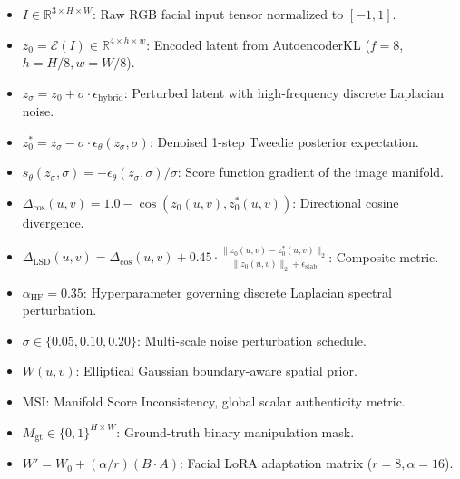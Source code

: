 \documentclass[12pt,a4paper]{report}
\begin{document}
\begin{tcolorbox}[academicbox, title=Architectural Framework \& Forensic Notation Guide]
\small
\begin{itemize}\setlength\itemsep{0.2em}
    \item $I \in \mathbb{R}^{3 \times H \times W}$: Raw RGB facial input tensor normalized to $[-1, 1]$.
    \item $z_0 = \mathcal{E}(I) \in \mathbb{R}^{4 \times h \times w}$: Encoded latent from AutoencoderKL ($f=8$, $h=H/8, w=W/8$).
    \item $z_\sigma = z_0 + \sigma \cdot \epsilon_{\text{hybrid}}$: Perturbed latent with high-frequency discrete Laplacian noise.
    \item $z^*_0 = z_\sigma - \sigma \cdot \epsilon_\theta(z_\sigma, \sigma)$: Denoised 1-step Tweedie posterior expectation.
    \item $s_\theta(z_\sigma, \sigma) = -\epsilon_\theta(z_\sigma, \sigma)/\sigma$: Score function gradient of the image manifold.
    \item $\Delta_{\cos}(u, v) = 1.0 - \cos(z_0(u, v), z^*_0(u, v))$: Directional cosine divergence.
    \item $\Delta_{\text{LSD}}(u, v) = \Delta_{\cos}(u, v) + 0.45 \cdot \frac{\|z_0(u, v) - z^*_0(u, v)\|_2}{\|z_0(u, v)\|_2 + \epsilon_{\text{stab}}}$: Composite metric.
    \item $\alpha_{\text{HF}} = 0.35$: Hyperparameter governing discrete Laplacian spectral perturbation.
    \item $\sigma \in \{0.05, 0.10, 0.20\}$: Multi-scale noise perturbation schedule.
    \item $W(u, v)$: Elliptical Gaussian boundary-aware spatial prior.
    \item $\text{MSI}$: Manifold Score Inconsistency, global scalar authenticity metric.
    \item $M_{\text{gt}} \in \{0, 1\}^{H \times W}$: Ground-truth binary manipulation mask.
    \item $W' = W_0 + (\alpha/r)(B \cdot A)$: Facial LoRA adaptation matrix ($r=8, \alpha=16$).
\end{itemize}
\end{tcolorbox}

\clearpage
{}
\setcounter{page}{5}

\end{document}
